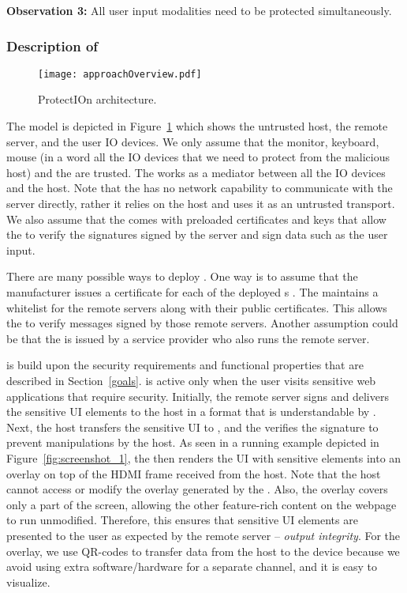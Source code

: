 \begin{tcolorbox}
\textbf{Observation 3:} All user input modalities need to be protected simultaneously.
\end{tcolorbox}

\subsubsection*{Description of \name}

\begin{figure}[t]
	\centering
	\texttt{[image: approachOverview.pdf]}
	\caption{\textsf{ProtectIOn} architecture.}
	\label{fig:approachOverview}
\end{figure}

The model is depicted in Figure~\ref{fig:approachOverview} which shows the untrusted host, the remote server, and the user IO devices. We only assume that the monitor, keyboard, mouse (in a word all the IO devices that we need to protect from the malicious host) and the \device are trusted. The \device works as a mediator between all the IO devices and the host. Note that the \device has no network capability to communicate with the server directly, rather it relies on the host and uses it as an untrusted transport. We also assume that the \device comes with preloaded certificates and keys that allow the \device to verify the signatures signed by the server and sign data such as the user input.

There are many possible ways to deploy \name. One way is to assume that the \device manufacturer issues a certificate for each of the deployed \device{}s . The \device maintains a whitelist for the remote servers along with their public certificates. This allows the \device to verify messages signed by those remote servers. Another assumption could be that the \device is issued by a service provider who also runs the remote server. 

\name is build upon the security requirements and functional properties that are described in Section~\ref{goals}. 
\device is active only when the user visits sensitive web applications that require \name security.
Initially, the remote server signs and delivers the sensitive UI elements to the host in a format that is understandable by \device. Next, the host transfers the sensitive UI to \device, and the \device verifies the signature to prevent manipulations by the host. As seen in a running example depicted in Figure~\ref{fig:screenshot_1}, the \device then renders the UI with sensitive elements into an overlay on top of the HDMI frame received from the host. Note that the host cannot access or modify the overlay generated by the \device. Also, the overlay covers only a part of the screen, allowing the other feature-rich content on the webpage to run unmodified. Therefore, this ensures that sensitive UI elements are presented to the user as expected by the remote server -- \emph{output integrity}. For the overlay, we use QR-codes to transfer data from the host to the device because we avoid using extra software/hardware for a separate channel, and it is easy to visualize.

